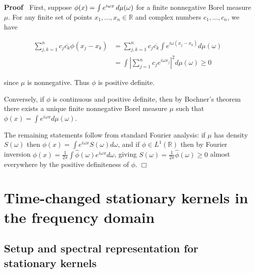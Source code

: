 \documentclass{article}
\newenvironment{proof}{\noindent\textbf{Proof\ }}{\hspace*{\fill}$\Box$\medskip}
{\theorembodyfont{\rmfamily}\newtheorem{example}{Example}}
\begin{document}
\begin{proof}
  First, suppose $\phi (x) = \int e^{i \omega x}  \hspace{0.17em} d \mu
  (\omega)$ for a finite nonnegative Borel measure $\mu$. For any finite set
  of points $x_1, \ldots, x_n \in \mathbb{R}$ and complex numbers $c_1,
  \ldots, c_n$, we have
  
  \begin{align}
    \sum_{j, k = 1}^n c_j \overline{c_k} \phi (x_j - x_k) & = \sum_{j, k =
    1}^n c_j \overline{c_k} \int e^{i \omega (x_j - x_k)} d \mu (\omega) \\
    & = \int \left| \sum_{j = 1}^n c_j e^{i \omega x_j} \right|^2 d \mu
    (\omega) \geq 0 
  \end{align}
  
  since $\mu$ is nonnegative. Thus $\phi$ is positive definite.
  
  Conversely, if $\phi$ is continuous and positive definite, then by Bochner's
  theorem there exists a unique finite nonnegative Borel measure $\mu$ such
  that $\phi (x) = \int e^{i \omega x} d \mu (\omega)$.
  
  The remaining statements follow from standard Fourier analysis: if $\mu$ has
  density $S (\omega)$ then $\phi (x) = \int e^{i \omega x} S (\omega) d
  \omega$, and if $\phi \in L^1 (\mathbb{R})$ then by Fourier inversion $\phi
  (x) = \frac{1}{2 \pi}  \int \hat{\phi} (\omega) e^{i \omega x} d \omega$,
  giving $S (\omega) = \frac{1}{2 \pi}  \hat{\phi} (\omega) \geq 0$ almost
  everywhere by the positive definiteness of $\phi$.
\end{proof}

\section{Time-changed stationary kernels in the frequency domain}

\subsection{Setup and spectral representation for stationary kernels}
\end{document}
